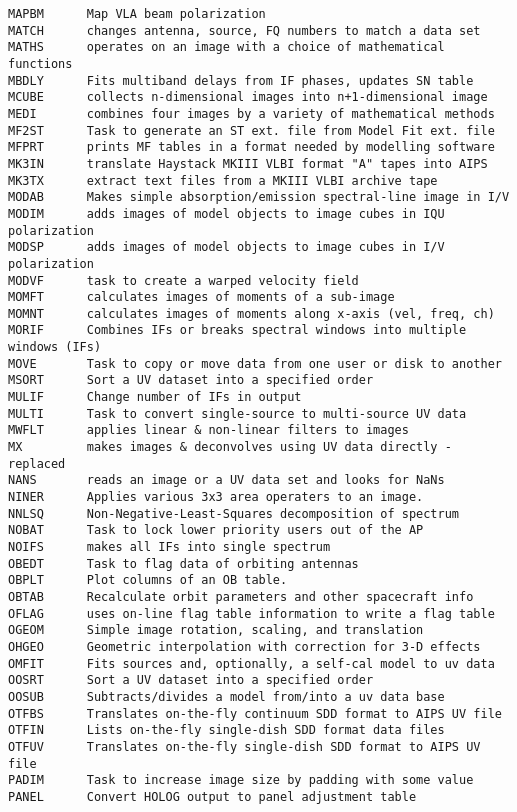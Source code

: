 \begin{verbatim}
MAPBM      Map VLA beam polarization
MATCH      changes antenna, source, FQ numbers to match a data set
MATHS      operates on an image with a choice of mathematical functions
MBDLY      Fits multiband delays from IF phases, updates SN table
MCUBE      collects n-dimensional images into n+1-dimensional image
MEDI       combines four images by a variety of mathematical methods
MF2ST      Task to generate an ST ext. file from Model Fit ext. file
MFPRT      prints MF tables in a format needed by modelling software
MK3IN      translate Haystack MKIII VLBI format "A" tapes into AIPS
MK3TX      extract text files from a MKIII VLBI archive tape
MODAB      Makes simple absorption/emission spectral-line image in I/V
MODIM      adds images of model objects to image cubes in IQU polarization
MODSP      adds images of model objects to image cubes in I/V polarization
MODVF      task to create a warped velocity field
MOMFT      calculates images of moments of a sub-image
MOMNT      calculates images of moments along x-axis (vel, freq, ch)
MORIF      Combines IFs or breaks spectral windows into multiple windows (IFs)
MOVE       Task to copy or move data from one user or disk to another
MSORT      Sort a UV dataset into a specified order
MULIF      Change number of IFs in output
MULTI      Task to convert single-source to multi-source UV data
MWFLT      applies linear & non-linear filters to images
MX         makes images & deconvolves using UV data directly - replaced
NANS       reads an image or a UV data set and looks for NaNs
NINER      Applies various 3x3 area operaters to an image.
NNLSQ      Non-Negative-Least-Squares decomposition of spectrum
NOBAT      Task to lock lower priority users out of the AP
NOIFS      makes all IFs into single spectrum
OBEDT      Task to flag data of orbiting antennas
OBPLT      Plot columns of an OB table.
OBTAB      Recalculate orbit parameters and other spacecraft info
OFLAG      uses on-line flag table information to write a flag table
OGEOM      Simple image rotation, scaling, and translation
OHGEO      Geometric interpolation with correction for 3-D effects
OMFIT      Fits sources and, optionally, a self-cal model to uv data
OOSRT      Sort a UV dataset into a specified order
OOSUB      Subtracts/divides a model from/into a uv data base
OTFBS      Translates on-the-fly continuum SDD format to AIPS UV file
OTFIN      Lists on-the-fly single-dish SDD format data files
OTFUV      Translates on-the-fly single-dish SDD format to AIPS UV file
PADIM      Task to increase image size by padding with some value
PANEL      Convert HOLOG output to panel adjustment table

\end{verbatim}
